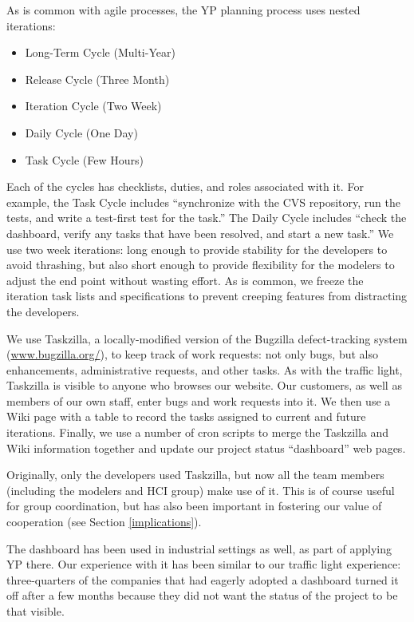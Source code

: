 \documentclass[times, 10pt,twocolumn]{article}
\newcommand{\tight}{\itemsep 0pt}
\begin{document}
As is common with agile processes, the YP planning process uses nested
iterations:

\pagebreak

\begin{itemize}
\tight
\item Long-Term Cycle (Multi-Year) 
\item Release Cycle (Three Month) 
\item Iteration Cycle (Two Week) 
\item Daily Cycle (One Day) 
\item Task Cycle (Few Hours) 
\end{itemize}

Each of the cycles has checklists, duties, and roles associated with
it.  For example, the Task Cycle includes ``synchronize with the CVS
repository, run the tests, and write a test-first test for the task.''
The Daily Cycle includes ``check the dashboard, verify any tasks that have
been resolved, and start a new task.''
We use two week iterations: long enough to provide stability 
for the developers to avoid thrashing, but also short enough to provide
flexibility for the modelers to adjust the end point without wasting effort.
As is common, we freeze the iteration task lists and specifications to prevent
creeping features from distracting the developers.

We use Taskzilla, a locally-modified version of the Bugzilla
defect-tracking system (\url{www.bugzilla.org/}), to keep track of work
requests: not only bugs, but also enhancements, administrative requests,
and other tasks.  As with the traffic light, Taskzilla is visible to anyone
who browses our website.  Our customers, as well as members of our own
staff, enter bugs and work requests into it.  We then use a Wiki page with
a table to record the tasks assigned to current and future iterations.
Finally, we use a number of cron scripts to merge the Taskzilla and Wiki
information together and update our project status ``dashboard'' web pages.

Originally, only the developers used Taskzilla, but now all the team
members (including the modelers and HCI group) make use of it.  This is of
course useful for group coordination, but has also been important in
fostering our value of cooperation (see Section \ref{implications}).

The dashboard has been used in industrial settings as well, as part of
applying YP there.  Our experience with it has been similar to our traffic
light experience: three-quarters of the companies that had eagerly adopted
a dashboard turned it off after a few months because they did not want the
status of the project to be that visible.
\end{document}
